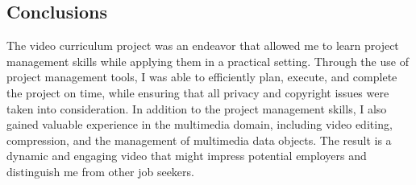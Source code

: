 \documentclass{article}
\begin{document}
\begin{multicols}{2}
\section{Conclusions}
The video curriculum project was an endeavor that allowed me to learn project management skills while applying them in a practical setting. Through the use of project 
management tools, I was able to efficiently plan, execute, and complete the project on time, while ensuring that all privacy and copyright issues were taken into 
consideration. In addition to the project management skills, I also gained valuable experience in the multimedia domain, including video editing, 
compression, and the management of multimedia data objects. The result is a dynamic and engaging video that might impress potential employers and distinguish me 
from other job seekers.



\end{multicols}
\end{document}
